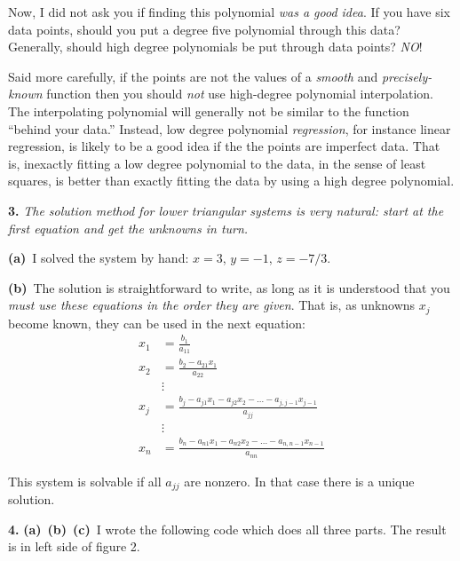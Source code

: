 \documentclass[11pt]{amsart}
\newcommand{\mfile}[1]{
\begin{quote}
\bigskip
\VerbatimInput[frame=single,label=\fbox{\normalsize \textsl{\,#1\,}},fontfamily=courier,fontsize=\scriptsize]{#1}
\end{quote}
}
\newcommand{\ppart}[1]{\textbf{(#1)}\, }
\newcommand{\epart}[1]{\medskip\noindent\quad\textbf{(#1)}\, }
\newcommand{\prob}[1]{\medskip\noindent\textbf{#1.}\quad }
\begin{document}
Now, I did not ask you if finding this polynomial \emph{was a good idea}.  If you have six data points, should you put a degree five polynomial through this data?  Generally, should high degree polynomials be put through data points?  \emph{NO}!

Said more carefully, if the points are not the values of a \emph{smooth} and \emph{precisely-known} function then you should \emph{not} use high-degree polynomial interpolation.  The interpolating polynomial will generally not be similar to the function ``behind your data.''  Instead, low degree polynomial \emph{regression}, for instance linear regression, is likely to be a good idea if the the points are imperfect data.   That is, inexactly fitting a low degree polynomial to the data, in the sense of least squares, is better than exactly fitting the data by using a high degree polynomial.


\prob{3} \emph{The solution method for lower triangular systems is very natural: start at the first equation and get the unknowns in turn.}

\epart{a} I solved the system by hand: $x=3$, $y=-1$, $z=-7/3$.

\epart{b}  The solution is straightforward to write, as long as it is understood that you \emph{must use these equations in the order they are given}.  That is, as unknowns $x_j$ become known, they can be used in the next equation:
\begin{align*}
x_1 &= \frac{b_1}{a_{11}} \\
x_2 &= \frac{b_2 - a_{21} x_1}{a_{22}} \\
& \vdots \\
x_j &= \frac{b_j - a_{j1} x_1 - a_{j2} x_2 - \dots - a_{j,j-1} x_{j-1}}{a_{jj}} \\
 & \vdots \\
x_n &= \frac{b_n - a_{n1} x_1 - a_{n2} x_2 - \dots - a_{n,n-1} x_{n-1}}{a_{nn}}
\end{align*}

This system is solvable if all $a_{jj}$ are nonzero.  In that case there is a unique solution.


\prob{4}  \ppart{a} \ppart{b} \ppart{c} I wrote the following code which does all three parts.  The result is in left side of figure 2.

\mfile{smoothpolyapprox.m}
\end{document}
